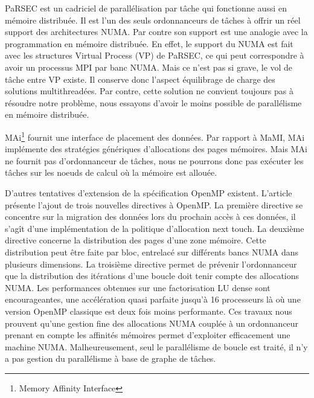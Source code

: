 PaRSEC est un cadriciel de parallélisation par tâche qui fonctionne aussi en mémoire distribuée.
%
Il est l'un des seuls ordonnanceurs de tâches à offrir un réel support des architectures NUMA.
%
Par contre son support est une analogie avec la programmation en mémoire distribuée.
%
En effet, le support du NUMA est fait avec les structures Virtual Process (VP) de PaRSEC, ce qui peut correspondre à avoir un processus MPI par banc NUMA.
%
Mais ce n'est pas si grave, le vol de tâche entre VP existe.
%
Il conserve donc l'aspect équilibrage de charge des solutions multithreadées.
%
Par contre, cette solution ne convient toujours pas à résoudre notre problème, nous essayons d'avoir le moins possible de parallélisme en mémoire distribuée.

MAi\footnote{Memory Affinity Interface}\cite{mai} fournit une interface de placement des données.
%
Par rapport à MaMI, MAi implémente des stratégies génériques d'allocations des pages mémoires.
%
Mais MAi ne fournit pas d'ordonnanceur de tâches, nous ne pourrons donc pas exécuter les tâches sur les noeuds de calcul où la mémoire est allouée.


D'autres tentatives d'extension de la spécification OpenMP existent.
%
L'article~\cite{openmp_numa} présente l'ajout de trois nouvelles directives à OpenMP.
%
La première directive se concentre sur la migration des données lors du prochain accès à ces données, il s'agît d'une implémentation de la politique d'allocation next touch.
%
La deuxième directive concerne la distribution des pages d'une zone mémoire.
%
Cette distribution peut être faite par bloc, entrelacé sur différents bancs NUMA dans plusieurs dimensions.
%
La troisième directive permet de prévenir l'ordonnanceur que la distribution des itérations d'une boucle doit tenir compte des allocations NUMA.
%
Les performances obtenues sur une factorisation LU dense sont encourageantes, une accélération quasi parfaite jusqu'à 16 processeurs là où une version OpenMP classique est deux fois moins performante.
%
Ces travaux nous prouvent qu'une gestion fine des allocations NUMA couplée à un ordonnanceur prenant en compte les affinités mémoires permet d'exploiter efficacement une machine NUMA.
%
Malheureusement, seul le parallélisme de boucle est traité, il n'y a pas gestion du parallélisme à base de graphe de tâches.


%
%
